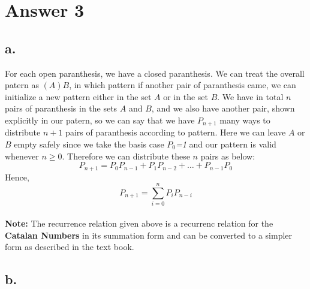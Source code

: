\documentclass[12pt]{article}
\begin{document}
\section*{Answer 3}

\subsection*{a.}

For each open paranthesis, we have a closed paranthesis. We can treat the overall patern as $(A)B$, in which pattern if another pair of paranthesis came, we can initialize a new pattern either in the set $A$ or in the set $B$. We have in total $n$ pairs of paranthesis in the sets $A$ and $B$, and we also have another pair, shown explicitly in our patern, so we can say that we have $P_{n+1}$ many ways to distribute $n+1$ pairs of paranthesis according to pattern. Here we can leave $A$ or $B$ empty safely since we take the basis case \textit{$P_0$=1} and our pattern is valid whenever $n\geq0$. Therefore we can distribute these $n$ pairs as below:\\
$$P_{n+1}=P_0 P_{n-1}+ P_1 P_{n-2}+\dots +P_{n-1} P_0$$
Hence,
$$P_{n+1}=\sum_{i=0}^{n}P_i P_{n-i}$$\\
\textbf{Note:} The recurrence relation given above is a recurrenc relation for the \textbf{Catalan Numbers} in its summation form and can be converted to a simpler form as described in the text book.

\subsection*{b.}
\end{document}

